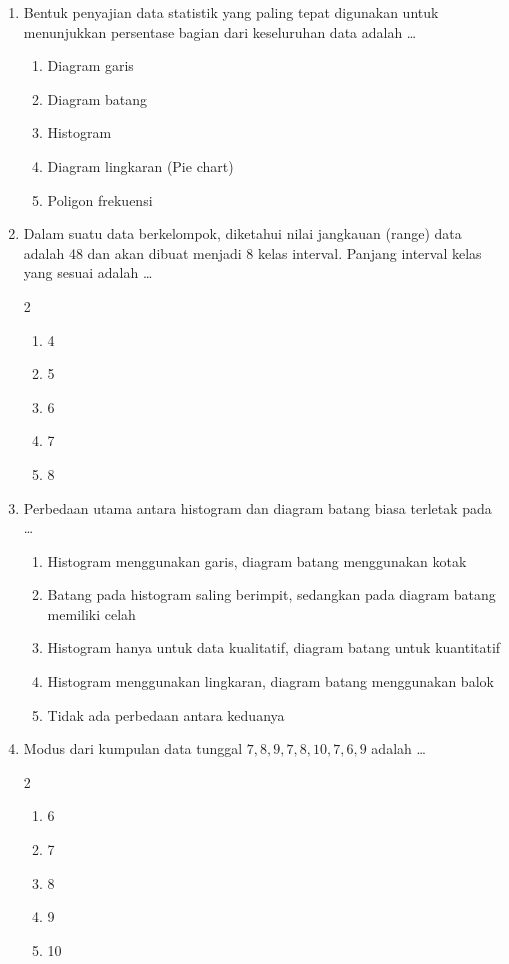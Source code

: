 \documentclass[12pt,a4paper]{article}
\begin{document}
\begin{enumerate}[itemsep=2ex]
    \item Bentuk penyajian data statistik yang paling tepat digunakan untuk menunjukkan persentase bagian dari keseluruhan data adalah \dots
    \begin{enumerate}[label=\Alph*.]
        \item Diagram garis
        \item Diagram batang
        \item Histogram
        \item Diagram lingkaran (Pie chart)
        \item Poligon frekuensi
    \end{enumerate}

    \item Dalam suatu data berkelompok, diketahui nilai jangkauan (range) data adalah 48 dan akan dibuat menjadi 8 kelas interval. Panjang interval kelas yang sesuai adalah \dots
    \begin{multicols}{2}
    \begin{enumerate}[label=\Alph*.]
        \item 4
        \item 5
        \item 6
        \item 7
        \item 8
    \end{enumerate}
    \end{multicols}

    \item Perbedaan utama antara histogram dan diagram batang biasa terletak pada \dots
    \begin{enumerate}[label=\Alph*.]
        \item Histogram menggunakan garis, diagram batang menggunakan kotak
        \item Batang pada histogram saling berimpit, sedangkan pada diagram batang memiliki celah
        \item Histogram hanya untuk data kualitatif, diagram batang untuk kuantitatif
        \item Histogram menggunakan lingkaran, diagram batang menggunakan balok
        \item Tidak ada perbedaan antara keduanya
    \end{enumerate}

    \item Modus dari kumpulan data tunggal $7, 8, 9, 7, 8, 10, 7, 6, 9$ adalah \dots
    \begin{multicols}{2}
    \begin{enumerate}[label=\Alph*.]
        \item 6
        \item 7
        \item 8
        \item 9
        \item 10
    \end{enumerate}
    \end{multicols}


\end{enumerate}
\end{document}
